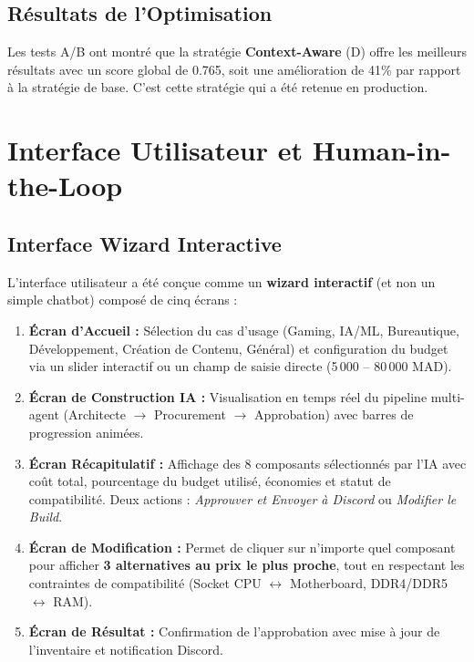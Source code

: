 \documentclass[12pt,a4paper]{article}
\begin{document}
\subsection{R\'esultats de l'Optimisation}
Les tests A/B ont montr\'e que la strat\'egie \textbf{Context-Aware} (D) offre les meilleurs r\'esultats avec un score global de 0.765, soit une am\'elioration de 41\% par rapport \`a la strat\'egie de base. C'est cette strat\'egie qui a \'et\'e retenue en production.

\section{Interface Utilisateur et Human-in-the-Loop}

\subsection{Interface Wizard Interactive}
L'interface utilisateur a \'et\'e con\c{c}ue comme un \textbf{wizard interactif} (et non un simple chatbot) compos\'e de cinq \'ecrans :

\begin{enumerate}
    \item \textbf{\'Ecran d'Accueil :} S\'election du cas d'usage (Gaming, IA/ML, Bureautique, D\'eveloppement, Cr\'eation de Contenu, G\'en\'eral) et configuration du budget via un slider interactif ou un champ de saisie directe (5\,000 -- 80\,000 MAD).
    \item \textbf{\'Ecran de Construction IA :} Visualisation en temps r\'eel du pipeline multi-agent (Architecte $\rightarrow$ Procurement $\rightarrow$ Approbation) avec barres de progression anim\'ees.
    \item \textbf{\'Ecran R\'ecapitulatif :} Affichage des 8 composants s\'electionn\'es par l'IA avec co\^ut total, pourcentage du budget utilis\'e, \'economies et statut de compatibilit\'e. Deux actions : \textit{Approuver et Envoyer \`a Discord} ou \textit{Modifier le Build}.
    \item \textbf{\'Ecran de Modification :} Permet de cliquer sur n'importe quel composant pour afficher \textbf{3 alternatives au prix le plus proche}, tout en respectant les contraintes de compatibilit\'e (Socket CPU $\leftrightarrow$ Motherboard, DDR4/DDR5 $\leftrightarrow$ RAM).
    \item \textbf{\'Ecran de R\'esultat :} Confirmation de l'approbation avec mise \`a jour de l'inventaire et notification Discord.
\end{enumerate}
\end{document}
